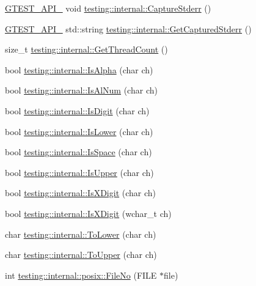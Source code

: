 \begin{DoxyCompactItemize}
\item 
\hyperlink{gtest-port_8h_aa73be6f0ba4a7456180a94904ce17790}{G\-T\-E\-S\-T\-\_\-\-A\-P\-I\-\_\-} void \hyperlink{namespacetesting_1_1internal_a8ec00d458d0d442bd64af7b5f9c22dda}{testing\-::internal\-::\-Capture\-Stderr} ()
\item 
\hyperlink{gtest-port_8h_aa73be6f0ba4a7456180a94904ce17790}{G\-T\-E\-S\-T\-\_\-\-A\-P\-I\-\_\-} std\-::string \hyperlink{namespacetesting_1_1internal_a374156401da17704099d0c33fa53adfb}{testing\-::internal\-::\-Get\-Captured\-Stderr} ()
\item 
size\-\_\-t \hyperlink{namespacetesting_1_1internal_a3b9b3649cd04558bf46c75de52a7ef34}{testing\-::internal\-::\-Get\-Thread\-Count} ()
\item 
bool \hyperlink{namespacetesting_1_1internal_aeb957087fd6bbf9db98ab7cd41b0c129}{testing\-::internal\-::\-Is\-Alpha} (char ch)
\item 
bool \hyperlink{namespacetesting_1_1internal_a83802e7f23324cd512232203662e1a98}{testing\-::internal\-::\-Is\-Al\-Num} (char ch)
\item 
bool \hyperlink{namespacetesting_1_1internal_a4bd96b7fa6486802d33ddc217af55a39}{testing\-::internal\-::\-Is\-Digit} (char ch)
\item 
bool \hyperlink{namespacetesting_1_1internal_ac26ce3883bc8919c27074975e958f3b7}{testing\-::internal\-::\-Is\-Lower} (char ch)
\item 
bool \hyperlink{namespacetesting_1_1internal_af429e04f70f9c10f6aa76a5d1ccd389f}{testing\-::internal\-::\-Is\-Space} (char ch)
\item 
bool \hyperlink{namespacetesting_1_1internal_a84f3baa379fec6bf5947cb5165aa8cc9}{testing\-::internal\-::\-Is\-Upper} (char ch)
\item 
bool \hyperlink{namespacetesting_1_1internal_aa234ef141278263fb143b616c74c86e7}{testing\-::internal\-::\-Is\-X\-Digit} (char ch)
\item 
bool \hyperlink{namespacetesting_1_1internal_a6ab68a30f8291c09b2289c132bbe3b16}{testing\-::internal\-::\-Is\-X\-Digit} (wchar\-\_\-t ch)
\item 
char \hyperlink{namespacetesting_1_1internal_ad9c627ef2a94245e3fd69e7ab3d49b42}{testing\-::internal\-::\-To\-Lower} (char ch)
\item 
char \hyperlink{namespacetesting_1_1internal_ac1b876a8133895bd553d4780ecaa1e3a}{testing\-::internal\-::\-To\-Upper} (char ch)
\item 
int \hyperlink{namespacetesting_1_1internal_1_1posix_a3117b067e1f942a2031e666953120ccc}{testing\-::internal\-::posix\-::\-File\-No} (F\-I\-L\-E $\ast$file)

\end{DoxyCompactItemize}

